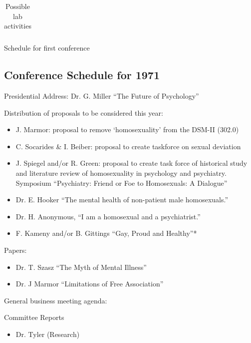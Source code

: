 \begin{refsection}
\begin{longtable}[!t]{ | P{7cm} | P{2.5cm} |   P{3cm} |}
\caption{Possible lab activities}
\label{table: labs}
\end{longtable}


\begin{apatextbox}{Schedule for first conference}

\subsection{Conference Schedule for 1971}
\label{conferenceschedulefor1971}

Presidential Address: Dr. G. Miller ``The Future of Psychology''

Distribution of proposals to be considered this year:

\begin{itemize}
\item J. Marmor: proposal to remove `homosexuality' from the DSM-II (302.0)

\item C. Socarides \& I. Beiber: proposal to create taskforce on sexual deviation

\item J. Spiegel and\slash or R. Green: proposal to create task force of historical study and literature review of homosexuality in psychology and psychiatry.
Symposium ``Psychiatry: Friend or Foe to Homosexuals: A Dialogue'' 

\item Dr. E. Hooker ``The mental health of non-patient male homosexuals.''

\item Dr. H. Anonymous, ``I am a homosexual and a psychiatrist.''

\item F. Kameny and\slash or B. Gittings ``Gay, Proud and Healthy''*

\end{itemize}

Papers:

\begin{itemize}
\item Dr. T. Szasz ``The Myth of Mental Illness''

\item Dr. J Marmor ``Limitations of Free Association''

\end{itemize}

General business meeting agenda:

Committee Reports 

\begin{itemize}
\item Dr. Tyler (Research)


\end{itemize}
\end{apatextbox}
\end{refsection}
